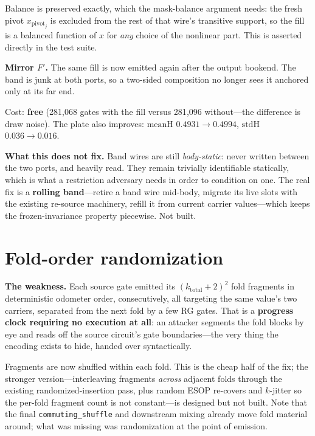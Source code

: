 \documentclass[11pt]{article}
\begin{document}
Balance is preserved exactly, which the mask-balance argument needs: the fresh
pivot $x_{\mathrm{pivot}_j}$ is excluded from the rest of that wire's transitive
support, so the fill is a balanced function of $x$ for \emph{any} choice of the
nonlinear part. This is asserted directly in the test suite.

\textbf{Mirror $F'$.} The same fill is now emitted again after the output
bookend. The band is junk at both ports, so a two-sided composition no longer
sees it anchored only at its far end.

Cost: \textbf{free} (281{,}068 gates with the fill versus 281{,}096 without---the
difference is draw noise). The plate also improves: $\mathrm{meanH}$
$0.4931\to0.4994$, $\mathrm{stdH}$ $0.036\to0.016$.

\textbf{What this does not fix.} Band wires are still \emph{body-static}: never
written between the two ports, and heavily read. They remain trivially
identifiable statically, which is what a restriction adversary needs in order to
condition on one. The real fix is a \textbf{rolling band}---retire a band wire
mid-body, migrate its live slots with the existing re-source machinery, refill
it from current carrier values---which keeps the frozen-invariance property
piecewise. Not built.

\section{Fold-order randomization}

\textbf{The weakness.} Each source gate emitted its $(k_{\mathrm{total}}+2)^2$
fold fragments in deterministic odometer order, consecutively, all targeting the
same value's two carriers, separated from the next fold by a few RG gates. That
is a \textbf{progress clock requiring no execution at all}: an attacker segments
the fold blocks by eye and reads off the source circuit's gate boundaries---the
very thing the encoding exists to hide, handed over syntactically.

Fragments are now shuffled within each fold. This is the cheap half of the fix;
the stronger version---interleaving fragments \emph{across} adjacent folds
through the existing randomized-insertion pass, plus random ESOP re-covers and
$k$-jitter so the per-fold fragment count is not constant---is designed but not
built. Note that the final \texttt{commuting\_shuffle} and downstream mixing
already move fold material around; what was missing was randomization at the
point of emission.
\end{document}
